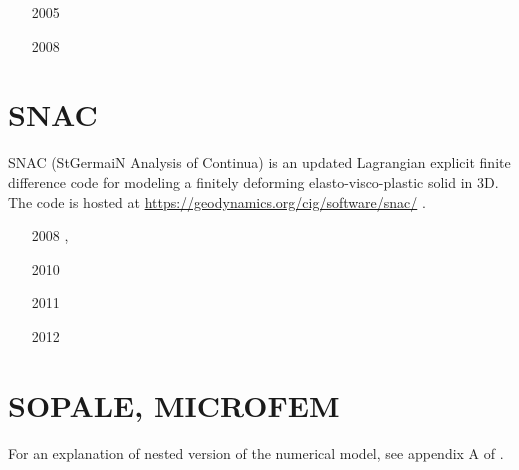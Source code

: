 \begin{small}
\begin{itemize}
\item[2005] \textcite{kaus05}
\item[2008] \textcite{kasb08}
\end{itemize}
\end{small}

\section{SNAC} 
SNAC (StGermaiN Analysis of Continua) is an updated Lagrangian explicit finite 
difference code for modeling a finitely deforming elasto-visco-plastic solid in 3D.
The code is hosted at \url{https://geodynamics.org/cig/software/snac/} .

\begin{small}
\begin{itemize}
\item[2008] \textcite{chlg08}, \textcite{chgu08}
\item[2010] \textcite{qula10}
\item[2011] \textcite{chss11}
\item[2012] \textcite{chbu12}
\end{itemize}
\end{small}

\section{SOPALE, MICROFEM}
For an explanation of nested version of the numerical model, see appendix A of \textcite{webe18}.

